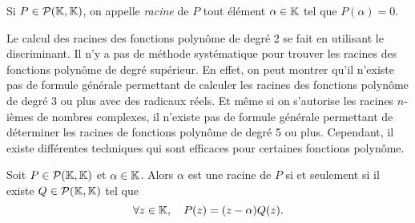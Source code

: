 \documentclass{magnolia}
\begin{document}
\begin{definition}
  Si $P\in\mathcal{P}(\mathbb{K},\mathbb{K})$, on appelle \emph{racine} de $P$ tout élément $\alpha\in\mathbb{K}$ tel que $P(\alpha)=0$.
  \end{definition}
  
  \begin{remarques}
  \remarque Le calcul
  des racines des fonctions polynôme de degré 2 se fait en utilisant le discriminant.
  \remarque Il n'y a pas de méthode
  systématique pour trouver les racines des fonctions polynôme de degré supérieur. En effet, on peut montrer qu'il
  n'existe pas de formule générale permettant de calculer les racines des fonctions polynôme de degré 3 ou plus avec
  des radicaux réels. Et même si on s'autorise les racines $n$-ièmes de nombres complexes, il n'existe pas
  de formule générale permettant de déterminer les racines de fonctions polynôme de degré 5 ou plus. Cependant, il
  existe différentes techniques qui sont efficaces pour certaines fonctions polynôme.
  \end{remarques}
  
  \begin{proposition}
  Soit $P\in\mathcal{P}(\mathbb{K},\mathbb{K})$ et $\alpha\in\mathbb{K}$. Alors $\alpha$ est une racine de $P$ si et seulement si il existe
  $Q\in\mathcal{P}(\mathbb{K},\mathbb{K})$ tel que
  \[\forall z\in\mathbb{K},\quad P(z)=(z-\alpha)Q(z).\]
  \end{proposition}
  
\end{document}
